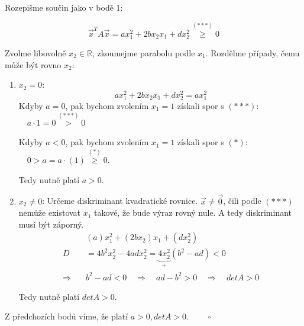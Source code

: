 \documentclass[12pt]{article}
\begin{document}
\begin{enumerate}
    Rozepišme součin jako v bodě 1:

    \[
      \vec{x}^T A \vec{x} = ax_1^2 + 2bx_2x_1 + dx_2^2 \overset{(***)}{\geq} 0
    \]

    Zvolme libovolně $x_2\in\mathbb{R}$, zkoumejme parabolu podle $x_1$. Rozdělme případy, čemu může být rovno $x_2$:

    \begin{enumerate}
      \item $x_2 = 0$:
        \[ax_1^2 + 2bx_2x_1 + dx_2^2 = ax_1^2\]
        Kdyby $a=0$, pak bychom zvolením $x_1=1$ získali spor s $(***)$: $\quad a\cdot1 = 0 \overset{(***)}{>} 0$
        
        Kdyby $a<0$, pak bychom zvolením $x_1=1$ získali spor s $(*)$: $\quad 0> a = a\cdot(1) \overset{(*)}{\geq} 0$.

        Tedy nutně platí \underline{\underline{$a>0$}}.
      \item $x_2 \neq 0$:
        Určeme diskriminant kvadratické rovnice. $\vec{x} \neq \vec{0}$, čili podle $(***)$ nemůže existovat $x_1$ takové, že
        bude výraz rovný nule.
        A tedy diskriminant musí být záporný.
        \begin{align*}
          &(a)x_1^2 + (2bx_2)x_1 + (dx_2^2) \\
          D &= 4b^2x_2^2 - 4adx_2^2 = \underbrace{4x_2^2}_+(b^2-ad) < 0 \\
          \Longrightarrow \quad &b^2-ad < 0 \quad \Longrightarrow \quad ad-b^2 > 0 \quad \Longrightarrow \quad detA>0
        \end{align*}

        Tedy nutně platí \underline{\underline{$detA>0$}}.
    \end{enumerate}

    Z předchozích bodů víme, že platí $a>0, detA>0$. $\quad\quad \square$
    

    
















































\end{enumerate}
\end{document}
